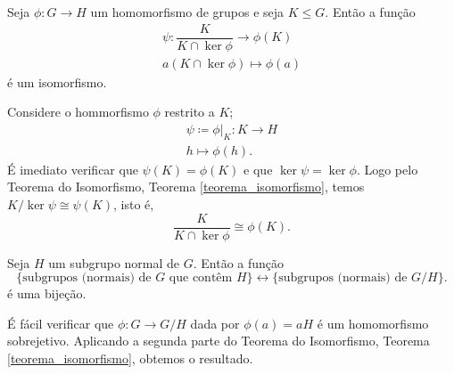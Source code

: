 \begin{corolario}
	Seja $\phi : G \to H$ um homomorfismo de grupos e seja $K \le G$. Ent\~ao a fun\c{c}\~ao
	\begin{align*}
		\psi : \dfrac{K}{K \cap \ker\phi} \to \phi(K)\\
		a(K \cap \ker\phi) \mapsto \phi(a)
	\end{align*}
	\'e um isomorfismo.
\end{corolario}
\begin{prova}
	Considere o hommorfismo $\phi$ restrito a $K$;
	\begin{align*}
		\psi \coloneqq \phi|_{K} : K \to H\\
		h \mapsto \phi(h).
	\end{align*}
	\'E imediato verificar que $\psi(K) = \phi(K)$ e que $\ker\psi = \ker\phi$. Logo pelo Teorema do Isomorfismo, Teorema \ref{teorema_isomorfismo}, temos $K/\ker\psi \cong \psi(K)$, isto \'e,
	\[
		\dfrac{K}{K \cap \ker\phi} \cong \phi(K).
	\]
\end{prova}

\begin{corolario}
	Seja $H$ um subgrupo normal de $G$. Ent\~ao a fun\c{c}\~ao
	\[
		\{\mbox{subgrupos (normais) de } G \mbox{ que cont\^em } H\} \longleftrightarrow \{\mbox{subgrupos (normais) de } G/H\}.
	\]
	\'e uma bije\c{c}\~ao.
\end{corolario}
\begin{prova}
	\'E f\'acil verificar que $\phi : G \to G/H$ dada por $\phi(a) = aH$ \'e um homomorfismo sobrejetivo. Aplicando a segunda parte do Teorema do Isomorfismo, Teorema \ref{teorema_isomorfismo}, obtemos o resultado.
\end{prova}

